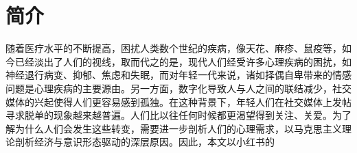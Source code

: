 
\chapter{简介}
随着医疗水平的不断提高，困扰人类数个世纪的疾病，像天花、麻疹、鼠疫等，如今已经淡出了人们的视线，取而代之的是，现代人们经受许多心理疾病的困扰，如神经退行病变、抑郁、焦虑和失眠，而对年轻一代来说，诸如择偶自卑带来的情感问题是心理疾病的主要源由\cite{chen2022nong}。另一方面，数字化导致人与人之间的联结减少，社交媒体的兴起使得人们更容易感到孤独。在这种背景下，年轻人们在社交媒体上发帖寻求脱单的现象越来越普遍。人们比以往任何时候都更渴望得到关注、关爱\cite{zhang2019gao}。为了解为什么人们会发生这些转变，需要进一步剖析人们的心理需求，以马克思主义理论剖析经济与意识形态驱动的深层原因。因此，本文以小红书的
